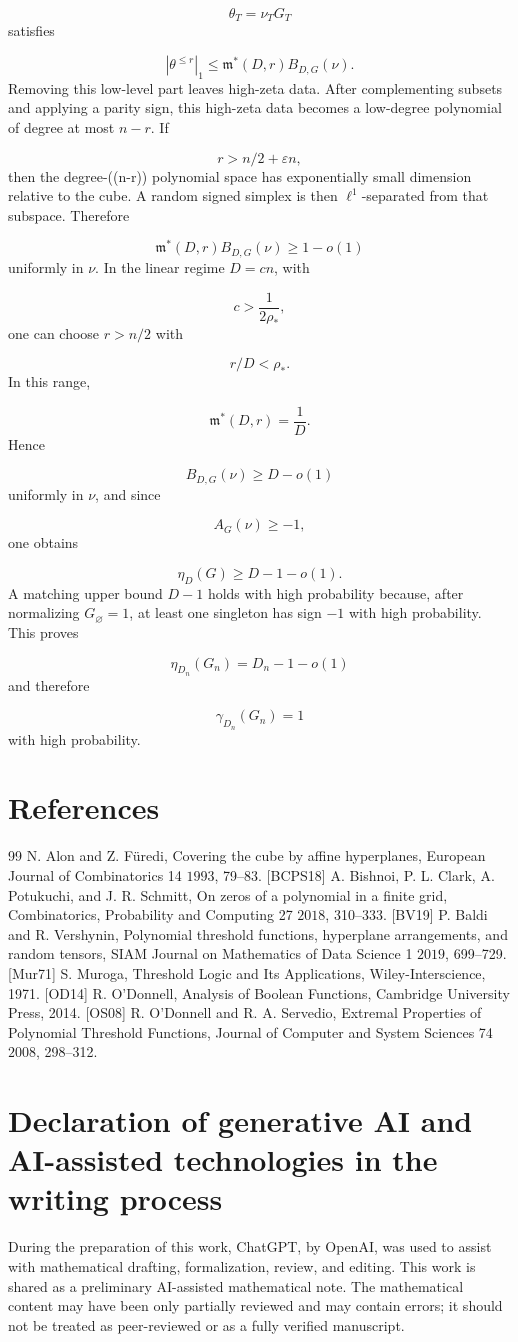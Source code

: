 \documentclass[11pt]{article}
\theoremstyle{definition}
\begin{document}
\[
\theta_T=\nu_TG_T
\]
satisfies

\[
|\theta^{\le r}|_1
\le
\mathfrak m^*(D,r)B_{D,G}(\nu).
\]
Removing this low-level part leaves high-zeta data. After complementing subsets and applying a parity sign, this high-zeta data becomes a low-degree polynomial of degree at most $n-r$. If

\[
r>n/2+\varepsilon n,
\]
then the degree-((n-r)) polynomial space has exponentially small dimension relative to the cube. A random signed simplex is then $\ell^1$-separated from that subspace. Therefore

\[
\mathfrak m^*(D,r)B_{D,G}(\nu)\ge1-o(1)
\]
uniformly in $\nu$. In the linear regime $D=cn$, with

\[
c>\frac1{2\rho_*},
\]
one can choose $r>n/2$ with

\[
r/D<\rho_*.
\]
In this range,

\[
\mathfrak m^*(D,r)=\frac1D.
\]
Hence

\[
B_{D,G}(\nu)\ge D-o(1)
\]
uniformly in $\nu$, and since

\[
A_G(\nu)\ge-1,
\]
one obtains

\[
\eta_D(G)\ge D-1-o(1).
\]
A matching upper bound $D-1$ holds with high probability because, after normalizing $G_\varnothing=1$, at least one singleton has sign $-1$ with high probability. This proves

\[
\eta_{D_n}(G_n)=D_n-1-o(1)
\]
and therefore

\[
\gamma_{D_n}(G_n)=1
\]
with high probability.

\section*{References}
\begin{thebibliography}{99}
 N. Alon and Z. Füredi, Covering the cube by affine hyperplanes, European Journal of Combinatorics 14 $1993$, 79--83. [BCPS18] A. Bishnoi, P. L. Clark, A. Potukuchi, and J. R. Schmitt, On zeros of a polynomial in a finite grid, Combinatorics, Probability and Computing 27 $2018$, 310--333. [BV19] P. Baldi and R. Vershynin, Polynomial threshold functions, hyperplane arrangements, and random tensors, SIAM Journal on Mathematics of Data Science 1 $2019$, 699--729. [Mur71] S. Muroga, Threshold Logic and Its Applications, Wiley-Interscience, 1971. [OD14] R. O'Donnell, Analysis of Boolean Functions, Cambridge University Press, 2014. [OS08] R. O'Donnell and R. A. Servedio, Extremal Properties of Polynomial Threshold Functions, Journal of Computer and System Sciences 74 $2008$, 298--312.
\end{thebibliography}

\section*{Declaration of generative AI and AI-assisted technologies in the writing process}
During the preparation of this work, ChatGPT, by OpenAI, was used to assist with mathematical drafting, formalization, review, and editing. This work is shared as a preliminary AI-assisted mathematical note. The mathematical content may have been only partially reviewed and may contain errors; it should not be treated as peer-reviewed or as a fully verified manuscript.
\end{document}
